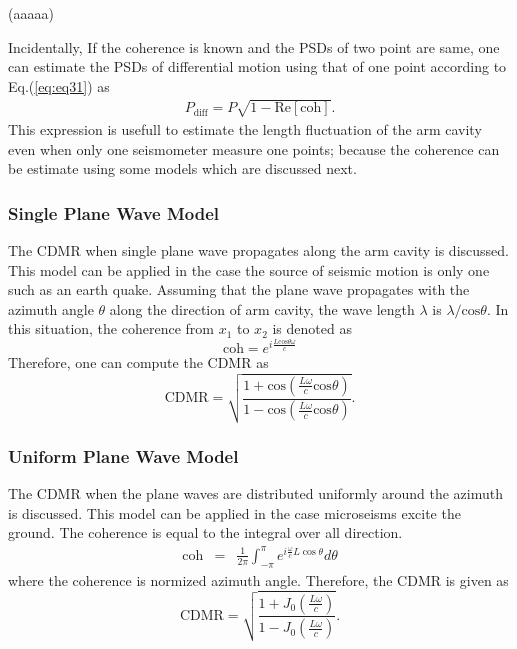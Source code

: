 (aaaaa)

Incidentally, If the coherence is known and the PSDs of two point are same, one can estimate the PSDs of differential motion using that of one point according to Eq.(\ref{eq:eq31}) as
\begin{eqnarray}
  P_\mathrm{diff} = P \sqrt{1 - \mathrm{Re[coh]}}. \label{eq:eq34}
\end{eqnarray}
This expression is usefull to estimate the length fluctuation of the arm cavity even when only one seismometer measure one points; because the coherence can be estimate using some models which are discussed next.

\subsubsection{Single Plane Wave Model}
The CDMR when single plane wave propagates along the arm cavity is discussed. This model can be applied in the case the source of seismic motion is only one such as an earth quake. Assuming that the plane wave propagates with the azimuth angle $\theta$ along the direction of arm cavity, the wave length $\lambda$ is $\lambda/\mathrm{cos}\theta$. In this situation, the coherence from $x_1$ to $x_2$ is denoted as
\begin{equation}
  \mathrm{coh}=e^{i\frac{L\mathrm{cos}\theta\omega}{c}}
\end{equation}
Therefore, one can compute the CDMR as
\begin{equation}  \label{eq:eq18}
  \mathrm{CDMR} = \sqrt{\frac{1+\mathrm{cos}(\frac{L\omega}{c}\mathrm{cos}\theta)}{1-\mathrm{cos}(\frac{L\omega}{c}\mathrm{cos}\theta)}}.
\end{equation}


\subsubsection{Uniform Plane Wave Model}
The CDMR when the plane waves are distributed uniformly around the azimuth is discussed. This model can be applied in the case microseisms excite the ground. The coherence is equal to the integral over all direction.
\begin{eqnarray} \label{eq:eq19}
  \mathrm{coh} &=& \frac{1}{2\pi} \int_{-\pi}^{\pi} e^{i\frac{\omega}{c} L\cos \theta} d \theta
\end{eqnarray}
where the coherence is normized azimuth angle. Therefore, the CDMR is given as
\begin{equation}  \label{eq:eq20}
  \mathrm{CDMR} = \sqrt{\frac{1+J_0(\frac{L\omega}{c})}{1-J_0(\frac{L\omega}{c})}} .
\end{equation}


